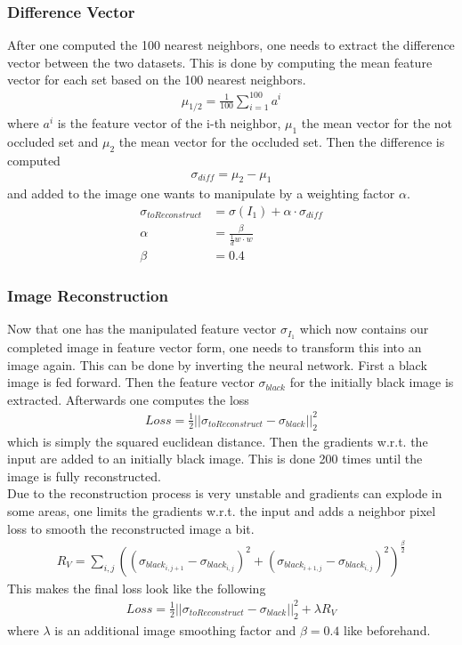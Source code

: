 \documentclass[
     11pt,         %
     a4paper,      %
     oneside,
     ]{article}
\begin{document}
\subsubsection{Difference Vector}
After one computed the 100 nearest neighbors, one needs to extract the difference vector between the two datasets.
This is done by computing the mean feature vector for each set based on the 100 nearest neighbors.
\begin{align*}
  \mu_{1/2} = \frac{1}{100} \sum^{100}_{i=1} a^i
\end{align*}
where $a^i$ is the feature vector of the i-th neighbor, $\mu_1$ the mean vector for the not occluded set and $\mu_2$ the mean vector for the occluded set.
Then the difference is computed
\begin{align*}
  \sigma_{diff} = \mu_2 - \mu_1
\end{align*}
and added to the image one wants to manipulate by a weighting factor $\alpha$.
\begin{align*}
  \sigma_{toReconstruct} &= \sigma (I_1) + \alpha \cdot \sigma_{diff}\\
  \alpha &= \frac{\beta}{\frac{1}{d} w \cdot w}\\
  \beta &= 0.4
\end{align*}
\subsubsection{Image Reconstruction}
Now that one has the manipulated feature vector $\sigma_{I_1}$ which now contains our completed image in feature vector form, one needs to transform this into an image again. This can be done by inverting the neural network. First a black image is fed forward. Then the feature vector $\sigma_{black}$ for the initially black image is extracted. Afterwards one computes the loss
\begin{align*}
  Loss = \frac{1}{2} ||\sigma_{toReconstruct} - \sigma_{black}||_2^2
\end{align*}
which is simply the squared euclidean distance.
Then the gradients w.r.t. the input are added to an initially black image. This is done 200 times until the image is fully reconstructed. \\
Due to the reconstruction process is very unstable and gradients can explode in some areas, one limits the gradients w.r.t. the input and adds a neighbor pixel loss to smooth the reconstructed image a bit.
\begin{align*}
  R_V = \sum_{i,j} ((\sigma_{black_{i,j+1}} - \sigma_{black_{i,j}})^2 + (\sigma_{black_{i+1,j}} - \sigma_{black_{i,j}})^2)^{\frac{\beta}{2}}
\end{align*}
This makes the final loss look like the following
\begin{align*}
  Loss = \frac{1}{2} ||\sigma_{toReconstruct} - \sigma_{black}||_2^2 + \lambda R_V
\end{align*}
where $\lambda$ is an additional image smoothing factor and $\beta = 0.4$ like beforehand.
\end{document}
